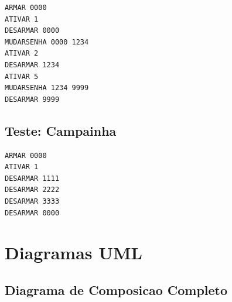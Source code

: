 \documentclass[12pt,a4paper]{article}
\begin{document}
\begin{lstlisting}
ARMAR 0000
ATIVAR 1
DESARMAR 0000
MUDARSENHA 0000 1234
ATIVAR 2
DESARMAR 1234
ATIVAR 5
MUDARSENHA 1234 9999
DESARMAR 9999
\end{lstlisting}

\subsection{Teste: Campainha}

\begin{lstlisting}
ARMAR 0000
ATIVAR 1
DESARMAR 1111
DESARMAR 2222
DESARMAR 3333
DESARMAR 0000
\end{lstlisting}

\newpage

\section{Diagramas UML}

\subsection{Diagrama de Composicao Completo}
\end{document}
